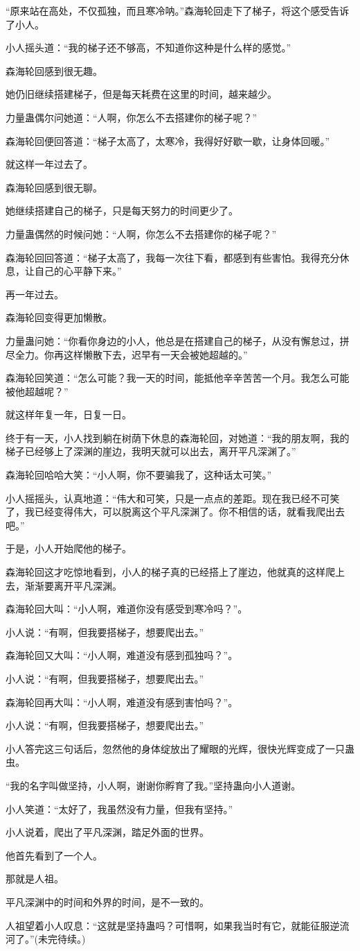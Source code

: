 \begin{this_body}
“原来站在高处，不仅孤独，而且寒冷呐。”森海轮回走下了梯子，将这个感受告诉了小人。

小人摇头道：“我的梯子还不够高，不知道你这种是什么样的感觉。”

森海轮回感到很无趣。

她仍旧继续搭建梯子，但是每天耗费在这里的时间，越来越少。

力量蛊偶尔问她道：“人啊，你怎么不去搭建你的梯子呢？”

森海轮回便回答道：“梯子太高了，太寒冷，我得好好歇一歇，让身体回暖。”

就这样一年过去了。

森海轮回感到很无聊。

她继续搭建自己的梯子，只是每天努力的时间更少了。

力量蛊偶然的时候问她：“人啊，你怎么不去搭建你的梯子呢？”

森海轮回回答道：“梯子太高了，我每一次往下看，都感到有些害怕。我得充分休息，让自己的心平静下来。”

再一年过去。

森海轮回变得更加懒散。

力量蛊问她：“你看你身边的小人，他总是在搭建自己的梯子，从没有懈怠过，拼尽全力。你再这样懒散下去，迟早有一天会被她超越的。”

森海轮回笑道：“怎么可能？我一天的时间，能抵他辛辛苦苦一个月。我怎么可能被他超越呢？”

就这样年复一年，日复一日。

终于有一天，小人找到躺在树荫下休息的森海轮回，对她道：“我的朋友啊，我的梯子已经够上了深渊的崖边，我明天就可以出去，离开平凡深渊了。”

森海轮回哈哈大笑：“小人啊，你不要骗我了，这种话太可笑。”

小人摇摇头，认真地道：“伟大和可笑，只是一点点的差距。现在我已经不可笑了，我已经变得伟大，可以脱离这个平凡深渊了。你不相信的话，就看我爬出去吧。”

于是，小人开始爬他的梯子。

森海轮回这才吃惊地看到，小人的梯子真的已经搭上了崖边，他就真的这样爬上去，渐渐要离开平凡深渊。

森海轮回大叫：“小人啊，难道你没有感受到寒冷吗？”。

小人说：“有啊，但我要搭梯子，想要爬出去。”

森海轮回又大叫：“小人啊，难道没有感到孤独吗？”。

小人说：“有啊，但我要搭梯子，想要爬出去。”

森海轮回再大叫：“小人啊，难道没有感到害怕吗？”。

小人说：“有啊，但我要搭梯子，想要爬出去。”

小人答完这三句话后，忽然他的身体绽放出了耀眼的光辉，很快光辉变成了一只蛊虫。

“我的名字叫做坚持，小人啊，谢谢你孵育了我。”坚持蛊向小人道谢。

小人笑道：“太好了，我虽然没有力量，但我有坚持。”

小人说着，爬出了平凡深渊，踏足外面的世界。

他首先看到了一个人。

那就是人祖。

平凡深渊中的时间和外界的时间，是不一致的。

人祖望着小人叹息：“这就是坚持蛊吗？可惜啊，如果我当时有它，就能征服逆流河了。”(未完待续。)

\end{this_body}

